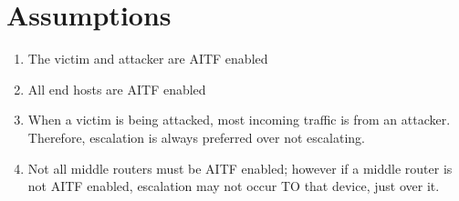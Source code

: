 \documentclass[11pt]{article}
\begin{document}
\section{Assumptions}
\begin{enumerate}
	\item The victim and attacker are AITF enabled
	\item All end hosts are AITF enabled
	\item When a victim is being attacked, most incoming traffic is from an
	attacker. Therefore, escalation is always preferred over not escalating.
	\item Not all middle routers must be AITF enabled; however if a middle
	router is not AITF enabled, escalation may not occur TO that device,
	just over it.
\end{enumerate}
\end{document}
